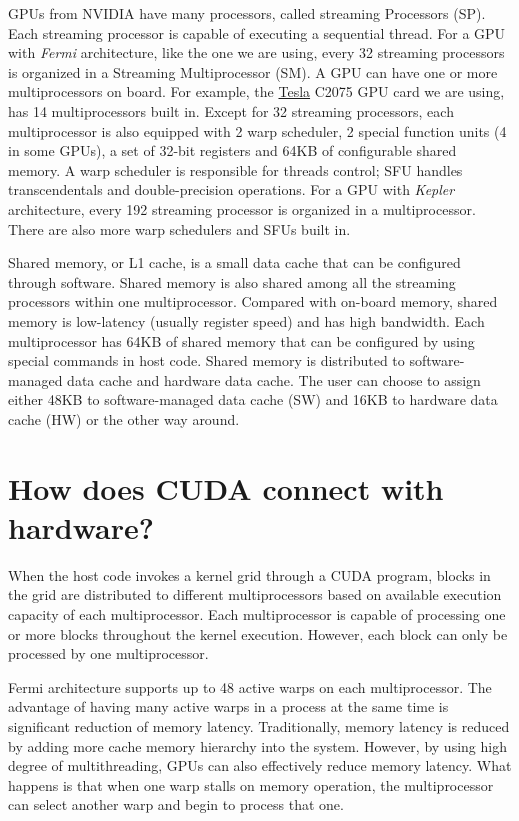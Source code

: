 \documentclass[letterpaper,10pt,openany,oneside]{sphinxmanual}
\begin{document}
GPUs from NVIDIA have many processors, called streaming Processors (SP). Each streaming processor is capable of executing a sequential thread. For a GPU with \emph{Fermi} architecture, like the one we are using, every 32 streaming processors is organized in a Streaming Multiprocessor (SM). A GPU can have one or more multiprocessors on board. For example, the \href{http://www.nvidia.com/object/tesla-supercomputing-solutions.html}{Tesla} C2075 GPU card we are using, has 14 multiprocessors built in. Except for 32 streaming processors, each multiprocessor is also equipped with 2 warp scheduler, 2 special function units (4 in some GPUs), a set of 32-bit registers and 64KB of configurable shared memory. A warp scheduler is responsible for threads control; SFU handles transcendentals and double-precision operations. For a GPU with \emph{Kepler} architecture, every 192 streaming processor is organized in a multiprocessor. There are also more warp schedulers and SFUs built in.

Shared memory, or L1 cache, is a small data cache that can be configured through software. Shared memory is also shared among all the streaming processors within one multiprocessor. Compared with on-board memory, shared memory is low-latency (usually register speed) and has high bandwidth. Each multiprocessor has 64KB of shared memory that can be configured by using special commands in host code. Shared memory is distributed to software-managed data cache and hardware data cache. The user can choose to assign either 48KB to software-managed data cache (SW) and 16KB to hardware data cache (HW) or the other way around.


\section{How does CUDA connect with hardware?}
\label{Introduction/Introduction:understanding-the-cuda-data-parallel-threading-model-a-primer}\label{Introduction/Introduction:how-does-cuda-connect-with-hardware}
When the host code invokes a kernel grid through a CUDA program, blocks in the grid are distributed to different multiprocessors based on available execution capacity of each multiprocessor. Each multiprocessor is capable of processing one or more blocks throughout the kernel execution. However, each block can only be processed by one multiprocessor.

Fermi architecture supports up to 48 active warps on each multiprocessor. The advantage of having many active warps in a process at the same time is significant reduction of memory latency. Traditionally, memory latency is reduced by adding more cache memory hierarchy into the system. However, by using high degree of multithreading, GPUs can also effectively reduce memory latency. What happens is that when one warp stalls on memory operation, the multiprocessor can select another warp and begin to process that one.
\end{document}
